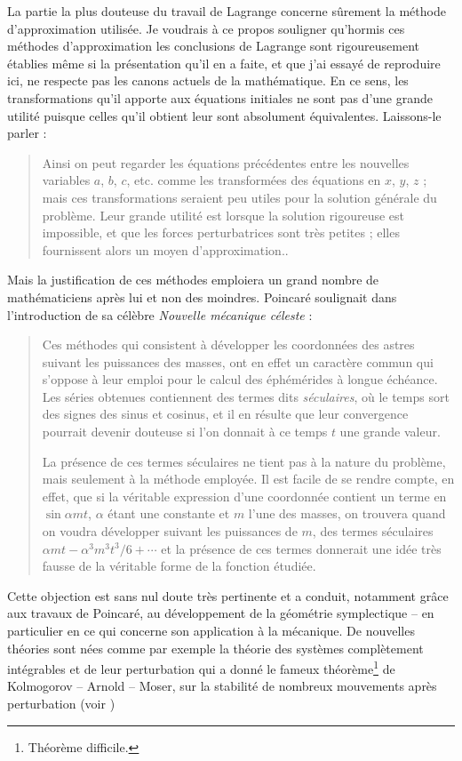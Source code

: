 \documentclass[12pt,paperletter, reqno]{amsart}
\theoremstyle{plain}
\theoremstyle{remark}
\begin{document}
  La partie la plus douteuse du travail de Lagrange concerne sûrement la méthode d'approximation utilisée.
  Je voudrais à ce propos souligner qu'hormis ces méthodes d'approximation les conclusions de Lagrange sont rigoureusement établies même si la présentation qu'il en a faite,
  et que j'ai essayé de reproduire ici,
  ne respecte pas les canons actuels de la mathématique.
  En ce sens,
  les transformations qu'il apporte aux équations initiales ne sont pas d'une grande utilité puisque celles qu'il obtient leur sont absolument équivalentes.
  Laissons-le parler :
  \begin{quote}
    \og Ainsi on peut regarder les équations précédentes entre les nouvelles variables $a$, $b$, $c$, etc. comme les transformées des équations en $x$, $y$, $z$ ; mais ces transformations seraient peu utiles pour la solution générale du problème. Leur grande utilité est lorsque la solution rigoureuse est impossible, et que les forces perturbatrices sont très petites ; elles fournissent alors un moyen d'approximation.\fg{}.
  \end{quote}
  Mais la justification de ces méthodes emploiera un grand nombre de mathématiciens après lui et non des moindres.
  Poincaré soulignait dans l'introduction de sa célèbre \emph{Nouvelle mécanique céleste} \cite{Poincare1} :
  \begin{quote}
    \og Ces méthodes qui consistent à développer les coordonnées des astres suivant les puissances des masses, ont en effet un caractère commun qui s'oppose à leur emploi pour le calcul des éphémérides à longue échéance. Les séries obtenues contiennent des termes dits \emph{séculaires}, où le temps sort des signes des sinus et cosinus, et il en résulte que leur convergence pourrait devenir douteuse si l'on donnait à ce temps $t$ une grande valeur.
    
    La présence de ces termes séculaires ne tient pas à la nature du problème, mais seulement à la méthode employée. Il est facile de se rendre compte, en effet, que si la véritable expression d'une coordonnée contient un terme en $\sin \alpha mt$, $\alpha$ étant une constante et $m$ l'une des masses, on trouvera quand on voudra développer suivant les puissances de $m$, des termes séculaires $\alpha mt - \alpha^3m^3t^3/6 +\cdots$ et la présence de ces termes donnerait une idée très fausse de la véritable forme de la fonction étudiée.\fg{}
  \end{quote}
  Cette objection est sans nul doute très pertinente et a conduit,
  notamment grâce aux travaux de Poincaré,
  au développement de la géométrie symplectique -- en particulier en ce qui concerne son application à la mécanique.
  De nouvelles théories sont nées comme par exemple la théorie des systèmes complètement intégrables et de leur perturbation qui a donné le fameux théorème\footnote{Théorème difficile.} de Kolmogorov -- Arnold -- Moser,
  sur la stabilité de nombreux mouvements après perturbation (voir \cite{Arnold0} \cite{Arnold1})
  
\end{document}
